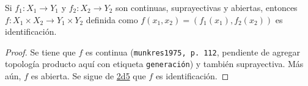 
\begin{proposition}
Si $f_1 : X_1 \longrightarrow Y_1$ y $f_2 : X_2 \longrightarrow Y_2$ son continuas, suprayectivas y abiertas, entonces $f : X_1 \times X_2 \longrightarrow Y_1 \times Y_2$ definida como $f(x_1, x_2) = (f_1(x_1), f_2(x_2))$ es identificación.
\end{proposition}

\begin{proof}
Se tiene que $f$ es continua (\texttt{munkres1975, p. 112}, pendiente de agregar topología producto aquí con etiqueta \texttt{generación}) y también suprayectiva. Más aún, $f$ es abierta. Se sigue de \hyperref[card:2d5]{\textsf{2d5}} que $f$ es identificación.
\end{proof}
